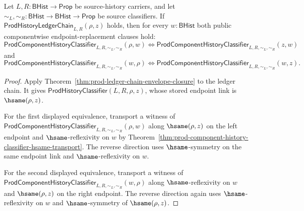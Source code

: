 \begin{theorem}
\label{thm:prod-ledger-chain-componentwise-classifier-endpoint-equivalence}
Let $L,R:\mathsf{BHist}\to\mathsf{Prop}$ be source-history carriers, and let
$\sim_L,\sim_R:\mathsf{BHist}\to\mathsf{BHist}\to\mathsf{Prop}$ be source
classifiers. If $\mathsf{ProdHistoryLedgerChain}_{L,R}(\rho,z)$ holds, then for
every $w:\mathsf{BHist}$ both public componentwise endpoint-replacement clauses
hold:
$$
\mathsf{ProdComponentHistoryClassifier}_{L,R,\sim_L,\sim_R}(\rho,w)
\Longleftrightarrow
\mathsf{ProdComponentHistoryClassifier}_{L,R,\sim_L,\sim_R}(z,w)
$$
and
$$
\mathsf{ProdComponentHistoryClassifier}_{L,R,\sim_L,\sim_R}(w,\rho)
\Longleftrightarrow
\mathsf{ProdComponentHistoryClassifier}_{L,R,\sim_L,\sim_R}(w,z).
$$
\end{theorem}
\begin{proof}
Apply Theorem~\ref{thm:prod-ledger-chain-envelope-closure} to the ledger chain.
It gives $\mathsf{ProdHistoryClassifier}(L,R,\rho,z)$, whose stored endpoint
link is $\hsame(\rho,z)$.

For the first displayed equivalence, transport a witness of
$\mathsf{ProdComponentHistoryClassifier}_{L,R,\sim_L,\sim_R}(\rho,w)$ along
$\hsame(\rho,z)$ on the left endpoint and $\hsame$-reflexivity on $w$ by
Theorem~\ref{thm:prod-component-history-classifier-hsame-transport}. The
reverse direction uses $\hsame$-symmetry on the same endpoint link and
$\hsame$-reflexivity on $w$.

For the second displayed equivalence, transport a witness of
$\mathsf{ProdComponentHistoryClassifier}_{L,R,\sim_L,\sim_R}(w,\rho)$ along
$\hsame$-reflexivity on $w$ and $\hsame(\rho,z)$ on the right endpoint. The
reverse direction again uses $\hsame$-reflexivity on $w$ and $\hsame$-symmetry
of $\hsame(\rho,z)$.
\end{proof}

